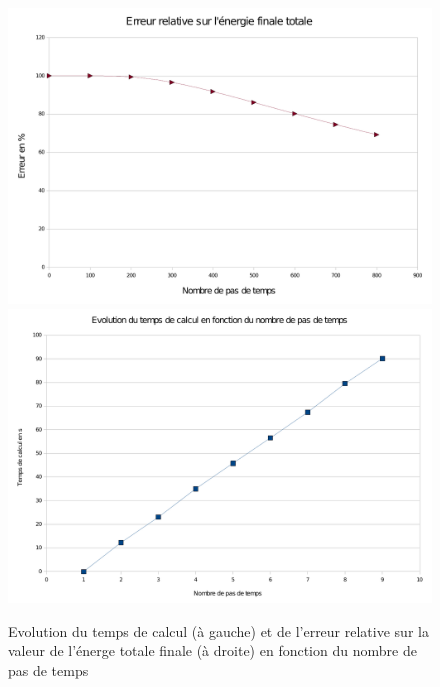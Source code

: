 \documentclass[]{article}
\begin{document}
\begin{figure}
\begin{center}
 \includegraphics[scale=0.32]{Figures/Erreur.pdf}
\includegraphics[scale=0.32]{Figures/temps.pdf}
\caption{Evolution du temps de calcul (à gauche) et de l'erreur relative
 sur la valeur de l'énerge totale finale (à droite) en fonction du nombre de
pas de temps}
\end{center}
\label{analimp}
\end{figure}
\end{document}
